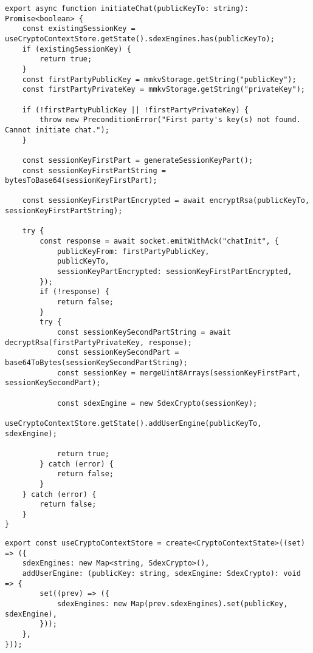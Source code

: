 \documentclass[../main.tex]{subfiles}
\begin{document}
\newpage

\begin{lstlisting}[caption={Inicjowanie komunikacji z innym użytkownikiem},label={lst:js_initiate_chat_function}]
export async function initiateChat(publicKeyTo: string): Promise<boolean> {
    const existingSessionKey = useCryptoContextStore.getState().sdexEngines.has(publicKeyTo);
    if (existingSessionKey) {
        return true;
    }
    const firstPartyPublicKey = mmkvStorage.getString("publicKey");
    const firstPartyPrivateKey = mmkvStorage.getString("privateKey");

    if (!firstPartyPublicKey || !firstPartyPrivateKey) {
        throw new PreconditionError("First party's key(s) not found. Cannot initiate chat.");
    }

    const sessionKeyFirstPart = generateSessionKeyPart();
    const sessionKeyFirstPartString = bytesToBase64(sessionKeyFirstPart);

    const sessionKeyFirstPartEncrypted = await encryptRsa(publicKeyTo, sessionKeyFirstPartString);

    try {
        const response = await socket.emitWithAck("chatInit", {
            publicKeyFrom: firstPartyPublicKey,
            publicKeyTo,
            sessionKeyPartEncrypted: sessionKeyFirstPartEncrypted,
        });
        if (!response) {
            return false;
        }
        try {
            const sessionKeySecondPartString = await decryptRsa(firstPartyPrivateKey, response);
            const sessionKeySecondPart = base64ToBytes(sessionKeySecondPartString);
            const sessionKey = mergeUint8Arrays(sessionKeyFirstPart, sessionKeySecondPart);

            const sdexEngine = new SdexCrypto(sessionKey);
            useCryptoContextStore.getState().addUserEngine(publicKeyTo, sdexEngine);

            return true;
        } catch (error) {
            return false;
        }
    } catch (error) {
        return false;
    }
}
\end{lstlisting}

\vfill

\begin{lstlisting}[caption={Definicja jednego ze stanów aplikacji przechowującego informacje o kluczach sesji i odpowiadających im kontaktach},label={lst:js_crypto_context}]
export const useCryptoContextStore = create<CryptoContextState>((set) => ({
    sdexEngines: new Map<string, SdexCrypto>(),
    addUserEngine: (publicKey: string, sdexEngine: SdexCrypto): void => {
        set((prev) => ({
            sdexEngines: new Map(prev.sdexEngines).set(publicKey, sdexEngine),
        }));
    },
}));
\end{lstlisting}
\end{document}
